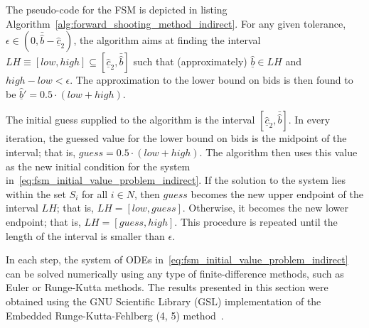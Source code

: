 The pseudo-code for the FSM is depicted in listing Algorithm~\ref{alg:forward_shooting_method_indirect}. For any given tolerance, $\epsilon\in\left(0, \bar{\hat{b}} - \underline{\hat{c}}_2\right)$, the algorithm aims at finding the interval $LH\equiv[low, high]\subseteq [\underline{\hat{c}}_2, \bar{\hat{b}}]$ such that (approximately) $\underline{\hat{b}}\in LH$ and $high-low < \epsilon$. The approximation to the lower bound on bids is then found to be $\underline{\hat{b}}' = 0.5\cdot(low + high)$.

The initial guess supplied to the algorithm is the interval $[\underline{\hat{c}}_2, \bar{\hat{b}}]$. In every iteration, the guessed value for the lower bound on bids is the midpoint of the interval; that is, $guess = 0.5\cdot(low + high)$. The algorithm then uses this value as the new initial condition for the system in~\eqref{eq:fsm_initial_value_problem_indirect}. If the solution to the system lies within the set $S_i$ for all $i\in N$, then $guess$ becomes the new upper endpoint of the interval $LH$; that is, $LH = [low, guess]$. Otherwise, it becomes the new lower endpoint; that is, $LH = [guess, high]$. This procedure is repeated until the length of the interval is smaller than $\epsilon$.

In each step, the system of ODEs in~\eqref{eq:fsm_initial_value_problem_indirect} can be solved numerically using any type of finite-difference methods, such as Euler or Runge-Kutta methods. The results presented in this section were obtained using the GNU Scientific Library (GSL) implementation of the Embedded Runge-Kutta-Fehlberg (4, 5) method~\cite{GSL}.

